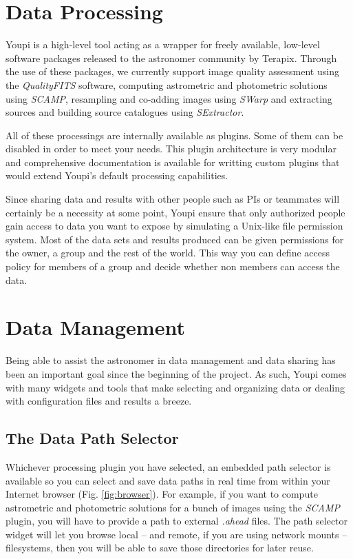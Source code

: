 \documentclass[11pt,twoside]{article}  %
\begin{document}
\section{Data Processing}

Youpi is a high-level tool acting as a wrapper for freely available, low-level software 
packages released to the astronomer community by Terapix. Through the use of these packages, 
we currently support image quality assessment using the \emph{QualityFITS} software, 
computing astrometric and photometric solutions using \emph{SCAMP}, resampling and co-adding 
images using \emph{SWarp} and extracting sources and building source catalogues using 
\emph{SExtractor}.

All of these processings are internally available as plugins. Some of them can be disabled 
in order to meet your needs. This plugin architecture is very modular and comprehensive 
documentation is available for writting custom plugins that would extend Youpi's default 
processing capabilities.

Since sharing data and results with other people such as PIs or teammates will certainly 
be a necessity at some point, Youpi ensure that only authorized people gain access to data 
you want to expose by simulating a Unix-like file permission system. Most of the data sets 
and results produced can be given permissions for the owner, a group and the rest of the 
world. This way you can define access policy for members of a group and decide whether non 
members can access the data.

\section{Data Management}

Being able to assist the astronomer in data management and data sharing has been an important 
goal since the beginning of the project. As such, Youpi comes with many widgets and tools that 
make selecting and organizing data or dealing with configuration files and results a breeze.

\subsection{The Data Path Selector}

Whichever processing plugin you have selected, an embedded path selector is available so you 
can select and save data paths in real time from within your Internet browser (Fig. \ref{fig:browser}).
For example, if you want to compute astrometric and photometric solutions for a bunch of images 
using the \emph{SCAMP} plugin, you will have to provide a path to external \emph{.ahead} files.
The path selector widget will let you browse local -- and remote, if you are using network mounts -- 
filesystems, then you will be able to save those directories for later reuse.
\end{document}
